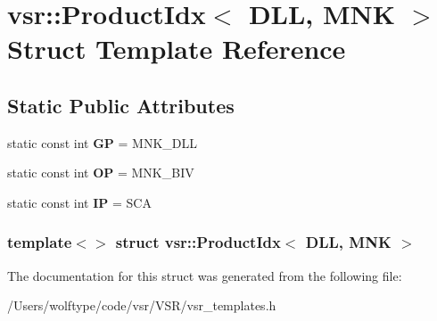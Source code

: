 \hypertarget{structvsr_1_1_product_idx_3_01_d_l_l_00_01_m_n_k_01_4}{\section{vsr\-:\-:Product\-Idx$<$ D\-L\-L, M\-N\-K $>$ Struct Template Reference}
\label{structvsr_1_1_product_idx_3_01_d_l_l_00_01_m_n_k_01_4}
}
\subsection*{Static Public Attributes}
\begin{DoxyCompactItemize}
\item 
\hypertarget{structvsr_1_1_product_idx_3_01_d_l_l_00_01_m_n_k_01_4_a08ca5471032beeb9b2e9823d64220e0c}{static const int {\bfseries G\-P} = M\-N\-K\-\_\-\-D\-L\-L}\label{structvsr_1_1_product_idx_3_01_d_l_l_00_01_m_n_k_01_4_a08ca5471032beeb9b2e9823d64220e0c}

\item 
\hypertarget{structvsr_1_1_product_idx_3_01_d_l_l_00_01_m_n_k_01_4_ad484b73078b86e1e5437b40054470235}{static const int {\bfseries O\-P} = M\-N\-K\-\_\-\-B\-I\-V}\label{structvsr_1_1_product_idx_3_01_d_l_l_00_01_m_n_k_01_4_ad484b73078b86e1e5437b40054470235}

\item 
\hypertarget{structvsr_1_1_product_idx_3_01_d_l_l_00_01_m_n_k_01_4_aa20b543116f5f0c8dc7e7c7f6b9961bd}{static const int {\bfseries I\-P} = S\-C\-A}\label{structvsr_1_1_product_idx_3_01_d_l_l_00_01_m_n_k_01_4_aa20b543116f5f0c8dc7e7c7f6b9961bd}

\end{DoxyCompactItemize}
\subsubsection*{template$<$$>$ struct vsr\-::\-Product\-Idx$<$ D\-L\-L, M\-N\-K $>$}



The documentation for this struct was generated from the following file\-:\begin{DoxyCompactItemize}
\item 
/\-Users/wolftype/code/vsr/\-V\-S\-R/vsr\-\_\-templates.\-h\end{DoxyCompactItemize}
